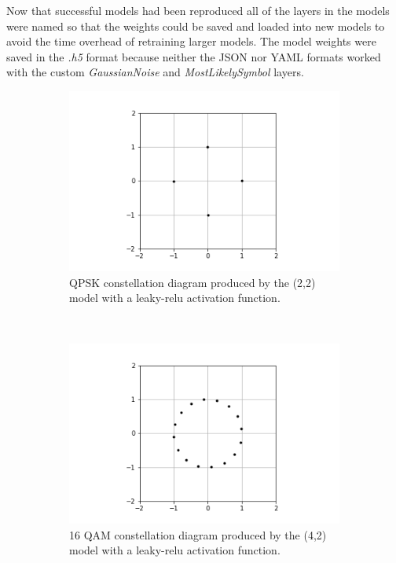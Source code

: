 \documentclass[12pt,onecolumn,letterpaper]{article}
\newcommand{\code}{\textit}
\begin{document}
Now that successful models had been reproduced all of the layers in the models were named so that the weights could be saved and loaded into new models to avoid the time overhead of retraining larger models. The model weights were saved in the \code{.h5} format because neither the JSON nor YAML formats worked with the custom \code{GaussianNoise} and \code{MostLikelySymbol} layers.

\begin{figure}[t]
   \centering
   \begin{subfigure}[t]{0.4\textwidth}
       \centering
       \includegraphics[width=\linewidth]{figures/leaky_relu_qpsk_constellation_diagram.png}
       \caption{QPSK constellation diagram produced by the (2,2) model with a leaky-relu activation function.}
   \end{subfigure}
   ~
   \begin{subfigure}[t]{0.4\textwidth}
       \centering
       \includegraphics[width=\linewidth]{figures/leaky_relu_16_QAM_constellation_diagram.png}
       \caption{16 QAM constellation diagram produced by the (4,2) model with a leaky-relu activation function.}
   \end{subfigure}
   \caption{}
   \label{fig:Lr22ConstDiags}
\end{figure}
\end{document}
